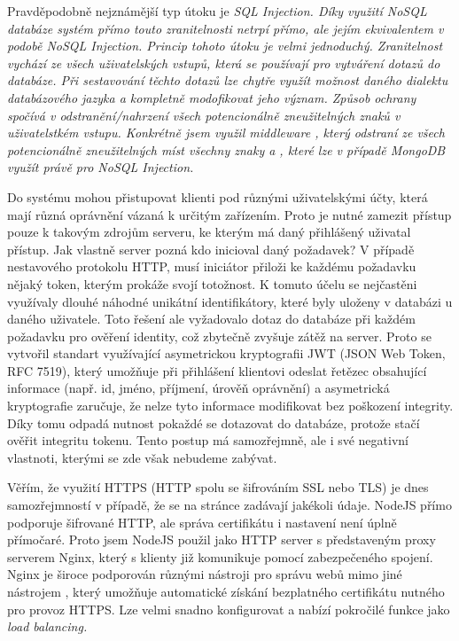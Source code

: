 Pravděpodobně nejznámější typ útoku je \itshape{SQL Injection}. Díky využití NoSQL databáze systém přímo touto zranitelnosti netrpí přímo, ale jejím ekvivalentem v podobě \itshape{NoSQL Injection}. Princip tohoto útoku je velmi jednoduchý. Zranitelnost vychází ze všech uživatelských vstupů, která se používají pro vytváření dotazů do databáze. Při sestavování těchto dotazů lze chytře využít možnost daného dialektu databázového jazyka a kompletně modofikovat jeho význam. Způsob ochrany spočívá v odstranění/nahrzení všech potencionálně zneužitelných znaků v uživatelstkém vstupu. Konkrétně jsem využil middleware , který odstraní ze všech potencionálně zneužitelných míst všechny znaky \uv{\$} a , které lze v případě MongoDB využít právě pro \itshape{NoSQL Injection}.

Do systému mohou přistupovat klienti pod různými uživatelskými účty, která mají různá oprávnění vázaná k určitým zařízením. Proto je nutné zamezit přístup pouze k takovým zdrojům serveru, ke kterým má daný přihlášený uživatal přístup. Jak vlastně server pozná kdo inicioval daný požadavek? V případě nestavového protokolu HTTP, musí iniciátor přiloži ke každému požadavku nějaký token, kterým prokáže svojí totožnost. K tomuto účelu se nejčastěni využívaly dlouhé náhodné unikátní identifikátory, které byly uloženy v databázi u daného uživatele. Toto řešení ale vyžadovalo dotaz do databáze při každém požadavku pro ověření identity, což zbytečně zvyšuje zátěž na server. Proto se vytvořil standart využívající asymetrickou kryptografii JWT (JSON Web Token, RFC 7519), který umožňuje při přihlášení klientovi odeslat řetězec obsahující informace (např. id, jméno, příjmení, úrověň oprávnění) a asymetrická kryptografie zaručuje, že nelze tyto informace modifikovat bez poškození integrity. Díky tomu odpadá nutnost pokaždé se dotazovat do databáze, protože stačí ověřit integritu tokenu. Tento postup má samozřejmně, ale i své negativní vlastnoti, kterými se zde však nebudeme zabývat.

Věřím, že využití HTTPS (HTTP spolu se šifrováním SSL nebo TLS) je dnes samozřejmností v případě, že se na stránce zadávají jakékoli údaje. NodeJS přímo podporuje šifrované HTTP, ale správa certifikátu i nastavení není úplně přímočaré. Proto jsem NodeJS použil jako HTTP server s představeným proxy serverem Nginx, který s klienty již komunikuje pomocí zabezpečeného spojení. Nginx je široce podporován různými nástroji pro správu webů mimo jiné nástrojem , který umožňuje automatické získání bezplatného certifikátu nutného pro provoz HTTPS. Lze velmi snadno konfigurovat a nabízí pokročilé funkce jako \itshape{load balancing}.

